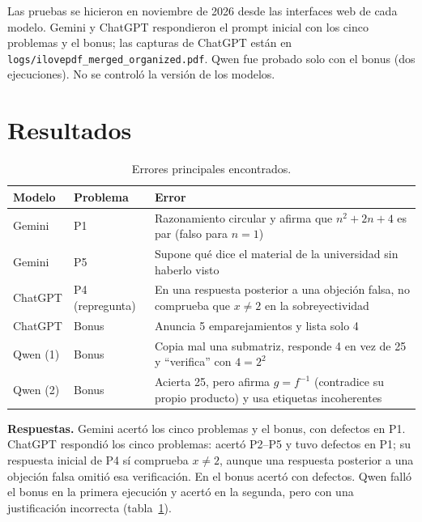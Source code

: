 \documentclass[conference]{IEEEtran}
\begin{document}
Las pruebas se hicieron en noviembre de 2026 desde las interfaces web de cada modelo. Gemini y ChatGPT respondieron el prompt inicial con los cinco problemas y el bonus; las capturas de ChatGPT están en \texttt{logs/ilovepdf\_merged\_organized.pdf}. Qwen fue probado solo con el bonus (dos ejecuciones). No se controló la versión de los modelos.

\section{Resultados}

\begin{table}[t]
\centering
\caption{Errores principales encontrados.}
\label{tab:errores}
\small
\begin{tabular}{@{}lp{1.2cm}p{4.6cm}@{}}
\toprule
Modelo & Problema & Error \\
\midrule
Gemini & P1 & Razonamiento circular y afirma que $n^2+2n+4$ es par (falso para $n=1$) \\
Gemini & P5 & Supone qué dice el material de la universidad sin haberlo visto \\
ChatGPT & P4 (repregunta) & En una respuesta posterior a una objeción falsa, no comprueba que $x\neq2$ en la sobreyectividad \\
ChatGPT & Bonus & Anuncia 5 emparejamientos y lista solo 4 \\
Qwen (1) & Bonus & Copia mal una submatriz, responde 4 en vez de 25 y ``verifica'' con $4=2^2$ \\
Qwen (2) & Bonus & Acierta 25, pero afirma $g=f^{-1}$ (contradice su propio producto) y usa etiquetas incoherentes \\
\bottomrule
\end{tabular}
\end{table}

\textbf{Respuestas.} Gemini acertó los cinco problemas y el bonus, con defectos en P1. ChatGPT respondió los cinco problemas: acertó P2--P5 y tuvo defectos en P1; su respuesta inicial de P4 sí comprueba $x\neq2$, aunque una respuesta posterior a una objeción falsa omitió esa verificación. En el bonus acertó con defectos. Qwen falló el bonus en la primera ejecución y acertó en la segunda, pero con una justificación incorrecta (tabla~\ref{tab:errores}).
\end{document}
